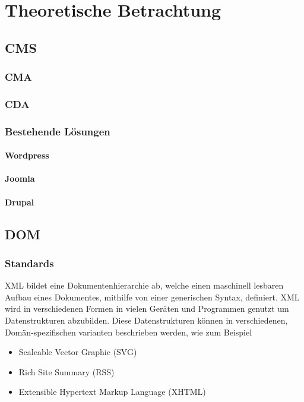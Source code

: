 \chapter{Theoretische Betrachtung}
\section{\acl{CMS}}
\subsection{\acl{CMA}}
\subsection{\acl{CDA}}
\subsection{Bestehende Lösungen}
\subsubsection{Wordpress}
\subsubsection{Joomla}
\subsubsection{Drupal}

\section{\acl{DOM}}
\subsection{Standards}
\ac{XML} bildet eine Dokumentenhierarchie ab, welche einen maschinell lesbaren Aufbau eines
Dokumentes, mithilfe von einer generischen Syntax, definiert. \ac{XML} wird in
verschiedenen Formen in vielen Geräten und Programmen genutzt um Datenstrukturen
abzubilden. Diese Datenstrukturen können in verschiedenen, Domän-spezifischen
varianten beschrieben werden, wie zum Beispiel

\begin{itemize}
\item Scaleable Vector Graphic (SVG)
\item Rich Site Summary (RSS)
\item Extensible Hypertext Markup Language (XHTML)
\end{itemize}

